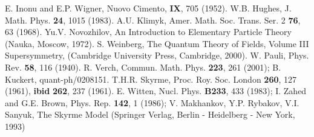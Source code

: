 \documentclass[a4paper,12pt]{article}%
\begin{document}
\begin{thebibliography}{99}
 E. Inonu and E.P. Wigner, Nuovo Cimento, 
{\bf IX}, 705 (1952).
 W.B. Hughes, J. Math. Phys. {\bf 24}, 1015 (1983).
 A.U. Klimyk, Amer. Math. Soc. Trans. Ser.
2 {\bf 76}, 63 (1968).
 Yu.V. Novozhilov, 
An Introduction to Elementary Particle
Theory (Nauka, Moscow, 1972).
 S. Weinberg, The Quantum 
Theory of Fields, Volume III Supersymmetry, (Cambridge 
University Press, Cambridge, 2000).
 W. Pauli, Phys. Rev. {\bf 58}, 116 (1940).
 R. Verch, Commun. Math. Phys. {\bf 223},
261 (2001); B. Kuckert, quant-ph/0208151.
 T.H.R. Skyrme, Proc. Roy. Soc. London
{\bf 260}, 127 (1961), {\bf ibid} {\bf 262}, 237 (1961).
 E. Witten, Nucl. Phys. {\bf B233}, 433 (1983);
I. Zahed and G.E. Brown, Phys. Rep. {\bf 142}, 1 (1986);
V. Makhankov, Y.P. Rybakov, V.I. Sanyuk, The Skyrme Model
(Springer Verlag, Berlin - Heidelberg - New York, 1993)
\end{thebibliography}
\end{document}
